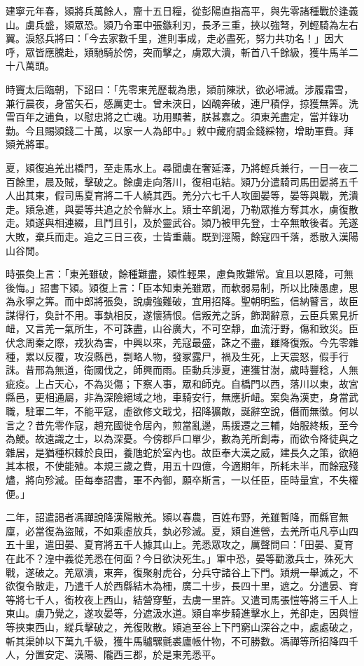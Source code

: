 \begin{pinyinscope}
建寧元年春，熲將兵萬餘人，齎十五日糧，從彭陽直指高平，與先零諸種戰於逢義山。虜兵盛，熲眾恐。熲乃令軍中張鏃利刃，長矛三重，挾以強弩，列輕騎為左右翼。淚怒兵將曰：「今去家數千里，進則事成，走必盡死，努力共功名！」因大呼，眾皆應騰赴，熲馳騎於傍，突而擊之，虜眾大潰，斬首八千餘級，獲牛馬羊二十八萬頭。

時竇太后臨朝，下詔曰：「先零東羌歷載為患，熲前陳狀，欲必埽滅。涉履霜雪，兼行晨夜，身當矢石，感厲吏士。曾未浹日，凶醜奔破，連尸積俘，掠獲無筭。洗雪百年之逋負，以慰忠將之亡魂。功用顯著，朕甚嘉之。須東羌盡定，當并錄功勤。今且賜熲錢二十萬，以家一人為郎中。」敕中藏府調金錢綵物，增助軍費。拜熲羌將軍。

夏，熲復追羌出橋門，至走馬水上。尋聞虜在奢延澤，乃將輕兵兼行，一日一夜二百餘里，晨及賊，擊破之。餘虜走向落川，復相屯結。熲乃分遣騎司馬田晏將五千人出其東，假司馬夏育將二千人繞其西。羌分六七千人攻圍晏等，晏等與戰，羌潰走。熲急進，與晏等共追之於令鮮水上。熲士卒飢渴，乃勒眾推方奪其水，虜復散走。熲遂與相連綴，且鬥且引，及於靈武谷。熲乃被甲先登，士卒無敢後者。羌遂大敗，棄兵而走。追之三日三夜，士皆重繭。既到涇陽，餘寇四千落，悉散入漢陽山谷閒。

時張奐上言：「東羌雖破，餘種難盡，熲性輕果，慮負敗難常。宜且以恩降，可無後悔。」詔書下熲。熲復上言：「臣本知東羌雖眾，而軟弱易制，所以比陳愚慮，思為永寧之筭。而中郎將張奐，說虜強難破，宜用招降。聖朝明監，信納瞽言，故臣謀得行，奐計不用。事埶相反，遂懷猜恨。信叛羌之訴，飾潤辭意，云臣兵累見折衄，又言羌一氣所生，不可誅盡，山谷廣大，不可空靜，血流汙野，傷和致災。臣伏念周秦之際，戎狄為害，中興以來，羌寇最盛，誅之不盡，雖降復叛。今先零雜種，累以反覆，攻沒縣邑，剽略人物，發冢露尸，禍及生死，上天震怒，假手行誅。昔邢為無道，衛國伐之，師興而雨。臣動兵涉夏，連獲甘澍，歲時豐稔，人無疵疫。上占天心，不為災傷；下察人事，眾和師克。自橋門以西，落川以東，故宮縣邑，更相通屬，非為深險絕域之地，車騎安行，無應折衄。案奐為漢吏，身當武職，駐軍二年，不能平寇，虛欲修文戢戈，招降獷敵，誕辭空說，僭而無徵。何以言之？昔先零作寇，趙充國徙令居內，煎當亂邊，馬援遷之三輔，始服終叛，至今為鯁。故遠識之士，以為深憂。今傍郡戶口單少，數為羌所創毒，而欲令降徒與之雜居，是猶種枳棘於良田，養虺蛇於室內也。故臣奉大漢之威，建長久之策，欲絕其本根，不使能殖。本規三歲之費，用五十四億，今適期年，所耗未半，而餘寇殘燼，將向殄滅。臣每奉詔書，軍不內御，願卒斯言，一以任臣，臣時量宜，不失權便。」

二年，詔遣謁者馮禪說降漢陽散羌。熲以春農，百姓布野，羌雖暫降，而縣官無廩，必當復為盜賊，不如乘虛放兵，埶必殄滅。夏，熲自進營，去羌所屯凡亭山四五十里，遣田晏、夏育將五千人據其山上。羌悉眾攻之，厲聲問曰：「田晏、夏育在此不？湟中義從羌悉在何面？今日欲決死生。」軍中恐，晏等勸激兵士，殊死大戰，遂破之。羌眾潰，東奔，復聚射虎谷，分兵守諸谷上下門。熲規一舉滅之，不欲復令散走，乃遣千人於西縣結木為柵，廣二十步，長四十里，遮之。分遣晏、育等將七千人，銜枚夜上西山，結營穿塹，去虜一里許。又遣司馬張愷等將三千人上東山。虜乃覺之，遂攻晏等，分遮汲水道。熲自率步騎進擊水上，羌卻走，因與愷等挾東西山，縱兵擊破之，羌復敗散。熲追至谷上下門窮山深谷之中，處處破之，斬其渠帥以下萬九千級，獲牛馬驢騾氈裘廬帳什物，不可勝數。馮禪等所招降四千人，分置安定、漢陽、隴西三郡，於是東羌悉平。


\end{pinyinscope}
